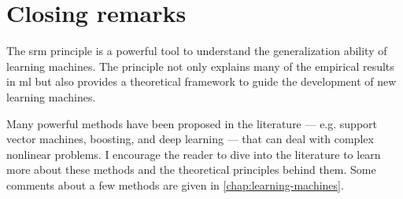 \section{Closing remarks}

The \gls{srm} principle is a powerful tool to understand the generalization ability of
learning machines.  The principle not only explains many of the empirical results in
\gls{ml} but also provides a theoretical framework to guide the development of new
learning machines.

Many powerful methods have been proposed in the literature --- e.g. support vector
machines, boosting, and deep learning --- that can deal with complex nonlinear problems.
I encourage the reader to dive into the literature to learn more about these methods and
the theoretical principles behind them.  Some comments about a few methods are given in
\cref{chap:learning-machines}.

